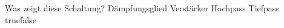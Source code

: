     {Was zeigt diese Schaltung?}
    {Dämpfungsglied}
    {Verstärker}
    {Hochpass}
    {Tiefpass}
    {true}{false}